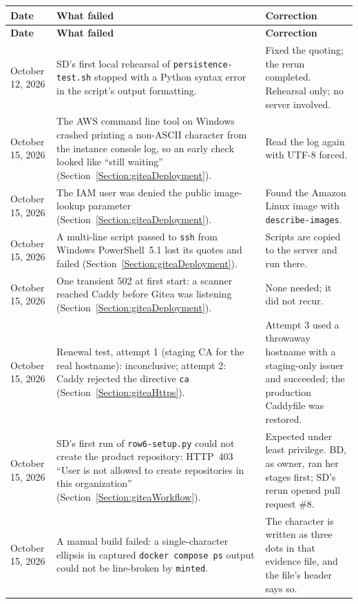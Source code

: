 \begin{tabularx}{\linewidth}{L{1.9cm}YY}
\caption{Failed tests and corrective actions\label{Table:FailedTests}}\\
\toprule \textbf{Date} & \textbf{What failed} & \textbf{Correction}\\ \midrule
\endfirsthead
\toprule \textbf{Date} & \textbf{What failed} & \textbf{Correction}\\ \midrule
\endhead \bottomrule \endlastfoot
October 12, 2026 & SD's first local rehearsal of \texttt{persistence-test.sh} stopped with a Python syntax error in the script's output formatting. & Fixed the quoting; the rerun completed. Rehearsal only; no server involved.\\
October 15, 2026 & The AWS command line tool on Windows crashed printing a non-ASCII character from the instance console log, so an early check looked like ``still waiting'' (Section~\ref{Section:giteaDeployment}). & Read the log again with UTF-8 forced.\\
October 15, 2026 & The IAM user was denied the public image-lookup parameter (Section~\ref{Section:giteaDeployment}). & Found the Amazon Linux image with \texttt{describe-images}.\\
October 15, 2026 & A multi-line script passed to \texttt{ssh} from Windows PowerShell~5.1 lost its quotes and failed (Section~\ref{Section:giteaDeployment}). & Scripts are copied to the server and run there.\\
October 15, 2026 & One transient 502 at first start: a scanner reached Caddy before Gitea was listening (Section~\ref{Section:giteaDeployment}). & None needed; it did not recur.\\
October 15, 2026 & Renewal test, attempt 1 (staging CA for the real hostname): inconclusive; attempt 2: Caddy rejected the directive \texttt{ca} (Section~\ref{Section:giteaHttps}). & Attempt 3 used a throwaway hostname with a staging-only issuer and succeeded; the production Caddyfile was restored.\\
October 15, 2026 & SD's first run of \texttt{row6-setup.py} could not create the product repository: HTTP~403 ``User is not allowed to create repositories in this organization'' (Section~\ref{Section:giteaWorkflow}). & Expected under least privilege. BD, as owner, ran her stages first; SD's rerun opened pull request \#8.\\
October 15, 2026 & A manual build failed: a single-character ellipsis in captured \texttt{docker compose ps} output could not be line-broken by \texttt{minted}. & The character is written as three dots in that evidence file, and the file's header says so.\\
\end{tabularx}

